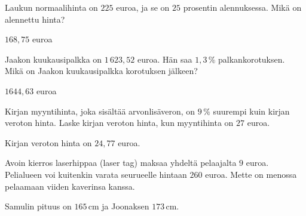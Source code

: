 \begin{tehtavasivu}
\begin{tehtava}
    Laukun normaalihinta on $225$ euroa, ja se on $25$ prosentin alennuksessa. Mikä on alennettu hinta?
    \begin{vastaus}
        $168,75$ euroa
    \end{vastaus}
\end{tehtava}

\begin{tehtava}
    Jaakon kuukausipalkka on $1\,623,52$ euroa. Hän saa $1,3\,\%$ palkankorotuksen. Mikä on Jaakon kuukausipalkka korotuksen jälkeen?
    \begin{vastaus}
        $1644,63$ euroa
    \end{vastaus}
\end{tehtava}

\begin{tehtava}
    Kirjan myyntihinta, joka sisältää arvonlisäveron, on $9\,\%$ suurempi kuin kirjan veroton hinta. Laske kirjan veroton hinta, kun myyntihinta on $27$ euroa.
    \begin{vastaus}
        Kirjan veroton hinta on $24,77$ euroa.
    \end{vastaus}
\end{tehtava}

\begin{tehtava}
	Avoin kierros laserhippaa (laser tag) maksaa yhdeltä pelaajalta $9$ euroa. Pelialueen voi kuitenkin varata seurueelle hintaan $260$ euroa. Mette on menossa pelaamaan viiden kaverinsa kanssa. 
	\begin{vastaus}
	\end{vastaus}

\end{tehtava}

\begin{tehtava}
    Samulin pituus on $165$\,cm ja Joonaksen $173$\,cm.
    \begin{vastaus}
    \end{vastaus}
\end{tehtava}


\end{tehtavasivu}
